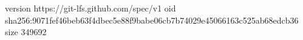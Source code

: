 version https://git-lfs.github.com/spec/v1
oid sha256:9071fef46beb63f4dbec5e88f9babe06cb7b74029e45066163c525ab68edcb36
size 349692
